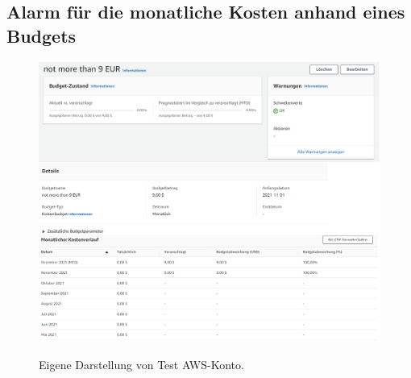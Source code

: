 \subsection*{Alarm für die monatliche Kosten anhand eines Budgets}\label{sec_Ang_B}
\begin{figure}[h!]
    \centering
    \includegraphics[scale=0.5]{sources/BudgetAlarm}
    \caption[Budgetalarm]{}
    \label{fig:CloudWatchDashboardTest} 
    Eigene Darstellung von Test AWS-Konto.
  \end{figure}
